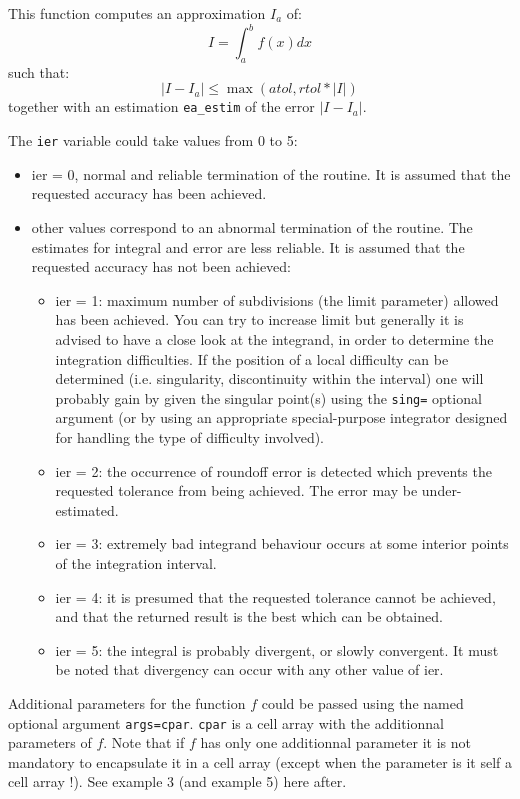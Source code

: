 \begin{mandescription}
This function computes an approximation $I_a$ of:
$$
   I = \int_a^b f(x) dx
$$
such that:
$$
   | I - I_a | \le  \max (atol, rtol*|I|)
$$
together with an estimation \verb+ea_estim+ of the error  $| I - I_a |$.

The \verb+ier+ variable could take values from 0 to 5: 
\begin{itemize}
\item ier = 0,  normal and reliable termination of the routine. It is assumed that the
      requested  accuracy has been achieved.
\item other values correspond to an abnormal termination of the routine. The estimates
      for integral and error are less reliable. It is assumed that the  requested accuracy
      has not been achieved:
      \begin{itemize}
      \item ier = 1: maximum number of subdivisions (the limit
            parameter) allowed has been achieved. You can try to
            increase limit but generally it is advised to have a close look at the
            integrand, in order to determine the integration
            difficulties. If the position of a local difficulty can
            be determined (i.e.  singularity, discontinuity within
            the interval) one will probably gain by given the singular
            point(s) using the \verb+sing=+ optional argument (or
            by using an appropriate special-purpose integrator 
            designed for handling the type  of difficulty involved).
      \item ier = 2: the occurrence of roundoff error is detected
            which prevents the requested tolerance from being
            achieved. The error may be under-estimated.
      \item ier = 3: extremely bad integrand behaviour occurs at 
            some interior points of the integration interval.
      \item ier = 4: it is presumed that the requested tolerance 
            cannot be achieved, and that the returned result is the
            best which can be obtained.
      \item ier = 5: the integral is probably divergent, or slowly
            convergent. It must be noted that divergency can occur with
            any other value of ier.
      \end{itemize}
\end{itemize}

Additional parameters for the function $f$ could be passed using the
named optional argument \verb+args=cpar+. \verb+cpar+ is a cell array
with the additionnal parameters of $f$. Note that if $f$ has only 
one additionnal parameter it is not mandatory to encapsulate it 
in a cell array (except when the parameter is it self a cell array !). 
See example 3 (and example 5) here after. 

\end{mandescription}

